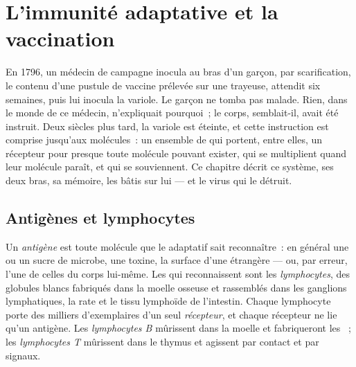 \chapter{L'immunité adaptative et la vaccination}\label{ch:g12:adaptive-immunity}

En 1796, un médecin de campagne inocula au bras d'un garçon, par
scarification, le contenu d'une pustule de vaccine prélevée sur une
trayeuse, attendit six semaines, puis lui inocula la variole. Le
garçon ne tomba pas malade. Rien, dans le monde de ce médecin,
n'expliquait pourquoi~; le corps, semblait-il, avait été instruit.
Deux siècles plus tard, la variole est éteinte, et cette instruction
est comprise jusqu'aux molécules~: un ensemble de  qui
portent, entre elles, un récepteur pour presque toute molécule pouvant
exister, qui se multiplient quand leur molécule paraît, et qui se
souviennent. Ce chapitre décrit ce système, ses deux bras, sa mémoire,
les  bâtis sur lui --- et le virus qui le détruit.

\section{Antigènes et lymphocytes}

\begin{definition}\label{def:g12:adaptive-immunity:antigen}
Un \emph{antigène} est toute molécule que le  adaptatif sait reconnaître~: en général une  ou un
sucre de microbe, une toxine, la surface d'une 
étrangère --- ou, par erreur, l'une de celles du corps lui-même. Les
 qui reconnaissent sont les
\emph{lymphocytes}, des globules blancs fabriqués
dans la moelle osseuse et rassemblés dans les ganglions lymphatiques,
la rate et le tissu lymphoïde de l'intestin. Chaque lymphocyte porte
des milliers d'exemplaires d'un seul \emph{récepteur}, et chaque
récepteur ne lie qu'un antigène. Les \emph{lymphocytes B} mûrissent
dans la moelle et fabriqueront les ~; les \emph{lymphocytes
T} mûrissent dans le thymus et agissent par contact et par signaux.
\end{definition}


